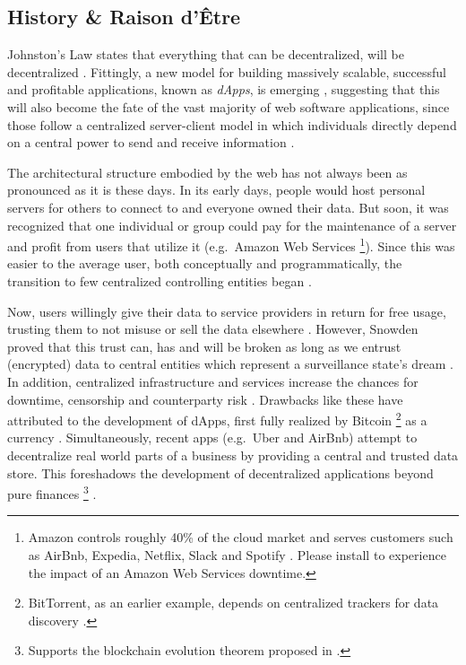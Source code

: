 \subsection{History \& Raison d'Être}
\label{dAppHistory}
Johnston's Law states that everything that can be decentralized, will be decentralized \cite{JohnstonsLaw}. Fittingly, a new model for building massively scalable, successful and profitable applications, known as \textit{\acp{dApp}}, is emerging \cite[p.~5]{Raval.2016} \cite[pp.~1--2]{Johnston2015}, suggesting that this will also become the fate of the vast majority of web software applications, since those follow a centralized server-client model in which individuals directly depend on a central power to send and receive information \cite[pp.~7--8]{Raval.2016}. 

The architectural structure embodied by the web has not always been as pronounced as it is these days. In its early days, people would host personal servers for others to connect to and everyone owned their data. But soon, it was recognized that one individual or group could pay for the maintenance of a server and profit from users that utilize it (e.g.~Amazon Web Services \footnote{Amazon controls roughly 40\% of the cloud market and serves customers such as AirBnb, Expedia, Netflix, Slack and Spotify \cite{Verge2018}. Please install \cite{fuckOffAWS} to experience the impact of an Amazon Web Services downtime.}). Since this was easier to the average user, both conceptually and programmatically, the transition to few centralized controlling entities began \cite[pp.~14]{Raval.2016}. 

Now, users willingly give their data to service providers in return for free usage, trusting them to not misuse or sell the data elsewhere \cite[p.~24]{Raval.2016}. However, Snowden proved that this trust can, has and will be broken as long as we entrust (encrypted) data to central entities which represent a surveillance state's dream \cite{Guardian2013} \cite[p.~25]{Raval.2016}. In addition, centralized infrastructure and services increase the chances for downtime, censorship and \gls{counterparty risk} \cite[p.~23]{Antonopoulos.2018}. Drawbacks like these have attributed to the development of \acp{dApp}, first fully realized by Bitcoin \footnote{BitTorrent, as an earlier example, depends on centralized trackers for data discovery \cite[p.~26]{Raval.2016}.} as a currency \cite[p.~1]{Johnston2015} \cite[p.~1]{bitcoin}. Simultaneously, recent apps (e.g.~Uber and AirBnb) attempt to decentralize real world parts of a business by providing a central and trusted data store. This foreshadows the development of decentralized applications beyond pure finances \footnote{Supports the blockchain evolution theorem proposed in \cite{Swan.2015}.} \cite[p.~15]{Raval.2016}.

